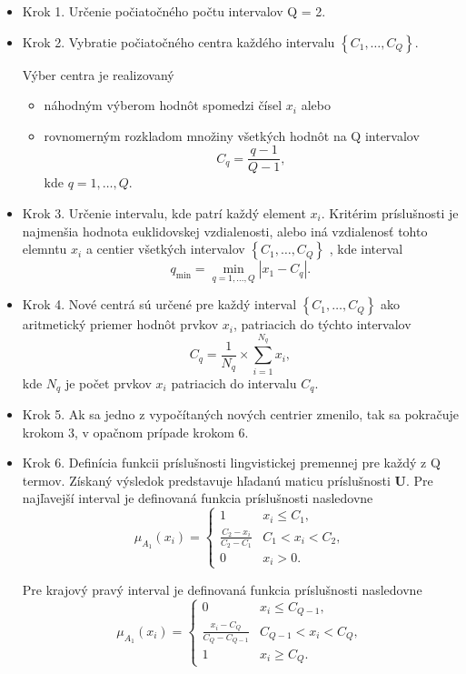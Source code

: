 \begin{itemize}
\item[]{Krok 1.}   Určenie počiatočného počtu intervalov Q = 2. 
\item[]{Krok 2.} Vybratie počiatočného centra každého intervalu $\left\{C_1, \ldots, C_Q\right\}$. 

Výber centra je realizovaný 
	\begin{itemize}
	\item náhodným výberom hodnôt spomedzi čísel $x_i$ alebo 
    \item rovnomerným rozkladom množiny všetkých hodnôt na Q intervalov 
    $$C_q=\frac{q-1}{Q-1},$$ kde $q=1,\ldots, Q. $
	\end{itemize}
    
 \item[]{Krok 3.}  Určenie intervalu, kde patrí každý element $x_i$. Kritérim príslušnosti je najmenšia hodnota euklidovskej vzdialenosti, alebo iná vzdialenosť tohto elemntu $x_i$ a centier všetkých intervalov $\left\{C_1, \ldots, C_Q\right\}$ , kde interval 
 $$q_{\min}=\min_{q=1, \ldots, Q} |x_1 - C_q|. $$
 
  \item[]{Krok 4.}
  Nové centrá sú určené pre každý interval $\left\{C_1, \ldots, C_Q\right\}$ ako aritmetický priemer hodnôt prvkov $x_i$, patriacich do týchto intervalov
  $$
  C_q = \frac{1}{N_q} \times \sum\limits_{i=1}^{N_q} x_i , 
  $$
  kde $N_q$ je počet prvkov $x_i$ patriacich do intervalu $C_q$. 
  
  
  
   \item[]{Krok 5.} Ak sa jedno z vypočítaných nových centrier zmenilo, tak sa pokračuje krokom 3, v opačnom prípade krokom 6. 
   
   
    \item[]{Krok 6.} Definícia funkcii príslušnosti lingvistickej premennej pre každý z Q termov. Získaný výsledok predstavuje hľadanú maticu príslušnosti \textbf{U}. 
    Pre najľavejší interval je definovaná funkcia príslušnosti nasledovne  
    $$\mu_{A_1}(x_i) = 
\begin{cases}
1 & x_i \leq  C_1,
\\
\frac{C_2-x_i}{C_2-C_1} & C_1 < x_i < C_2, 
\\
0 & x_i > 0.
\end{cases}$$

Pre krajový pravý interval je definovaná funkcia príslušnosti nasledovne 
    $$\mu_{A_1}(x_i) = 
\begin{cases}
0 & x_i \leq  C_{Q-1},
\\
\frac{x_i-C_Q}{C_Q-C_{Q-1}} & C_{Q-1} < x_i < C_Q, 
\\
1 & x_i \geq C_Q. 
\end{cases}$$


\end{itemize}
